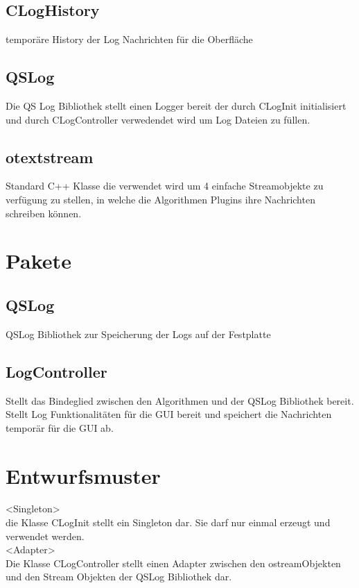 \subsection{CLogHistory}\label{Logger: CLogHistory}
temporäre History der Log Nachrichten für die Oberfläche 
\beginMembers
{}
\closeMembers
\subsection{QSLog}\label{Logger: QSLog}
Die QS Log Bibliothek stellt einen Logger bereit der durch CLogInit initialisiert und durch CLogController verwedendet wird um Log Dateien zu füllen.

\subsection{otextstream}\label{Logger: otextstream}
Standard C++ Klasse die verwendet wird um 4 einfache Streamobjekte zu verfügung zu stellen, in welche die Algorithmen Plugins ihre Nachrichten schreiben können.
\section{Pakete}
\subsection{QSLog}
QSLog Bibliothek zur Speicherung der Logs auf der Festplatte
\subsection{LogController}
Stellt das Bindeglied zwischen den Algorithmen und der QSLog Bibliothek bereit.
Stellt Log Funktionalitäten für die GUI bereit und speichert die Nachrichten temporär für die GUI ab.
\section{Entwurfsmuster}
<Singleton>
\\die Klasse CLogInit stellt ein Singleton dar. Sie darf nur einmal erzeugt und verwendet werden.
\\<Adapter>
\\Die Klasse CLogController stellt einen Adapter zwischen den ostreamObjekten und den Stream Objekten der QSLog Bibliothek dar.

